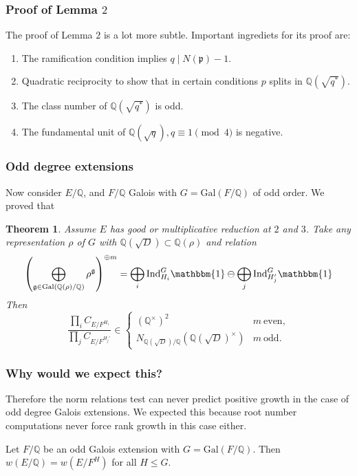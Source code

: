 \documentclass{beamer}
\newcommand{\Gal}{\mathrm{Gal}}
\newcommand{\rk}{\mathrm{rk}}
\newcommand{\Ind}{\mathrm{Ind}}
\newcommand{\QQ}{\mathbb{Q}}
\newcommand{\pp}{\mathfrak{p}}
\newcommand{\bQ}{\mathbb{Q}}
\theoremstyle{plain}
\newtheorem{thm}{Theorem}[section]
\begin{document}
\begin{frame}
    \frametitle{Proof of Lemma $2$}
    The proof of Lemma $2$ is a lot more subtle. Important ingrediets for its proof are:
    \begin{enumerate}
        \item The ramification condition implies $q\mid N(\pp)-1$.
        \item Quadratic reciprocity to show that in certain conditions $p$ splits in $\QQ(\sqrt{q^*})$.
        \item The class number of $\QQ(\sqrt{q^*})$ is odd.
        \item The fundamental unit of $\QQ(\sqrt{q}), q\equiv1\pmod{4}$ is negative.
    \end{enumerate}
\end{frame}
\fi


\begin{frame}
    \frametitle{Odd degree extensions}
    Now consider $E / \bQ$, and $F / \bQ$ Galois with $G = \Gal(F / \bQ)$ of odd order. \pause
    We proved that
    {\begin{thm}\label{odd-exts}
       Assume $E$ has good or multiplicative reduction at $2$ and $3$. 
       Take any representation $\rho$ of $G$ with $\bQ(\sqrt{D}) \subset \bQ(\rho)$ and relation
       \begin{equation*}\label{odd-exp}
        \left(\bigoplus_{\mathfrak{g}\in\Gal(\QQ(\rho)/\QQ)}\rho^{\mathfrak{g}}\right)^{\oplus m }=\bigoplus_i\Ind_{H_i}^G\mathbbm{1}\ominus\bigoplus_j\Ind_{H_j'}^G\mathbbm{1}
       \end{equation*}
         Then
        \[ \frac{\prod_i C_{E/F^{H_i}}}{\prod_j C_{E/F^{H_j'}}}  \in 
           \begin{cases} 
            (\bQ^{\times})^2 & m \ \text{even},\\
               N_{\bQ(\sqrt{D}) / \bQ}(\bQ(\sqrt{D})^{\times}) & m \ \text{odd}.
           \end{cases} \] 
       \end{thm}}
\end{frame}

\begin{frame}
    \frametitle{Why would we expect this?}
        Therefore the norm relations test can never predict positive growth in the case of odd degree Galois extensions. \pause We expected this because root number computations never force rank growth in this case either. \pause
        \begin{lemma}\label{lem_oddroot}
            Let $F / \bQ$ be an odd Galois extension with $G = \Gal(F / \bQ)$. Then $w(E / \bQ) = w(E / F^H)$ for all $H \leq G$. 
        \end{lemma}

\end{frame}
\end{document}
